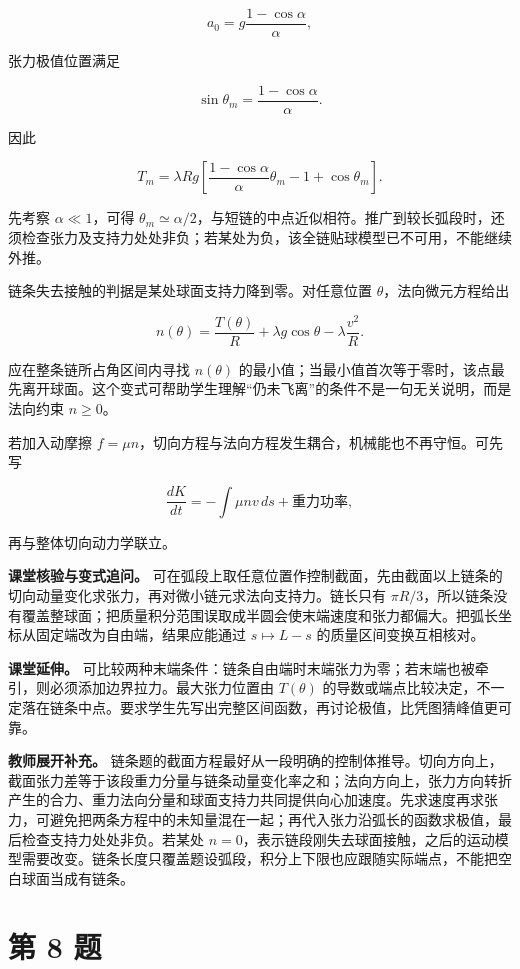 \documentclass[12pt,a4paper,UTF8]{ctexart}
\begin{document}
\[
a_0=g\frac{1-\cos\alpha}{\alpha},
\]

张力极值位置满足

\[
\sin\theta_m=\frac{1-\cos\alpha}{\alpha}.
\]

因此

\[
T_m=\lambda Rg
\left[\frac{1-\cos\alpha}{\alpha}\theta_m-1+\cos\theta_m\right].
\]

先考察 \(\alpha\ll1\)，可得
\(\theta_m\simeq\alpha/2\)，与短链的中点近似相符。推广到较长弧段时，还须检查张力及支持力处处非负；若某处为负，该全链贴球模型已不可用，不能继续外推。

链条失去接触的判据是某处球面支持力降到零。对任意位置
\(\theta\)，法向微元方程给出

\[
n(\theta)=\frac{T(\theta)}R+\lambda g\cos\theta-\lambda\frac{v^2}{R}.
\]

应在整条链所占角区间内寻找 \(n(\theta)\)
的最小值；当最小值首次等于零时，该点最先离开球面。这个变式可帮助学生理解``仍未飞离''的条件不是一句无关说明，而是法向约束
\(n\geq0\)。

若加入动摩擦
\(f=\mu n\)，切向方程与法向方程发生耦合，机械能也不再守恒。可先写

\[
\frac{dK}{dt}=-\int \mu n v\,ds+\text{重力功率},
\]

再与整体切向动力学联立。

\textbf{课堂核验与变式追问。}
可在弧段上取任意位置作控制截面，先由截面以上链条的切向动量变化求张力，再对微小链元求法向支持力。链长只有
\(\pi R/3\)，所以链条没有覆盖整球面；把质量积分范围误取成半圆会使末端速度和张力都偏大。把弧长坐标从固定端改为自由端，结果应能通过
\(s\mapsto L-s\) 的质量区间变换互相核对。

\textbf{课堂延伸。}
可比较两种末端条件：链条自由端时末端张力为零；若末端也被牵引，则必须添加边界拉力。最大张力位置由
\(T(\theta)\)
的导数或端点比较决定，不一定落在链条中点。要求学生先写出完整区间函数，再讨论极值，比凭图猜峰值更可靠。

\textbf{教师展开补充。}
链条题的截面方程最好从一段明确的控制体推导。切向方向上，截面张力差等于该段重力分量与链条动量变化率之和；法向方向上，张力方向转折产生的合力、重力法向分量和球面支持力共同提供向心加速度。先求速度再求张力，可避免把两条方程中的未知量混在一起；再代入张力沿弧长的函数求极值，最后检查支持力处处非负。若某处
\(n=0\)，表示链段刚失去球面接触，之后的运动模型需要改变。链条长度只覆盖题设弧段，积分上下限也应跟随实际端点，不能把空白球面当成有链条。

\newpage

\section{第 8 题}\label{ux7b2c-8-ux9898}
\end{document}
